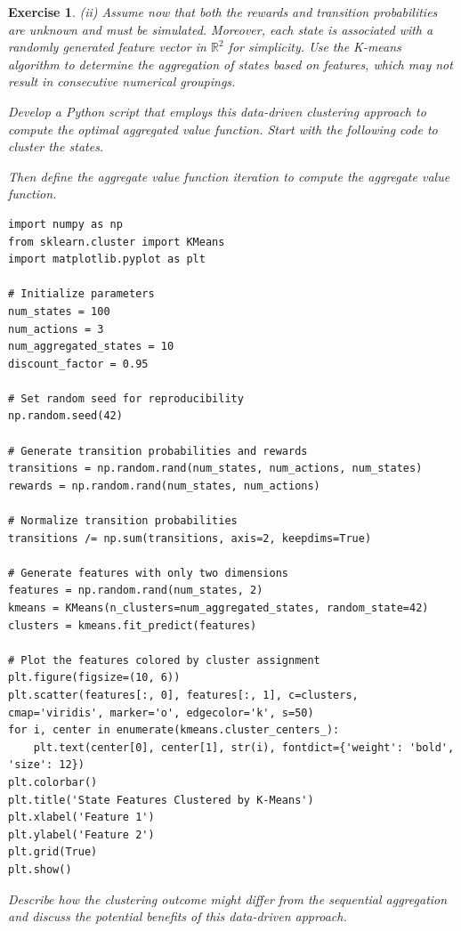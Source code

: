\documentclass[letter,11pt]{article}
\newtheorem{exercise}{Exercise}[section]
\begin{document}
\begin{exercise}
   (ii) Assume now that both the rewards and transition probabilities are unknown and must be simulated. Moreover, each state is associated with a randomly generated feature vector in $\mathbb{R}^{2}$ for simplicity. Use the K-means algorithm to determine the aggregation of states based on features, which may not result in consecutive numerical groupings.

    Develop a Python script that employs this data-driven clustering approach to compute the optimal aggregated value function. Start with the following code to cluster the states.  

    Then define the aggregate value function iteration to compute the aggregate value function. 
   \begin{lstlisting}
import numpy as np
from sklearn.cluster import KMeans
import matplotlib.pyplot as plt

# Initialize parameters
num_states = 100
num_actions = 3
num_aggregated_states = 10
discount_factor = 0.95

# Set random seed for reproducibility
np.random.seed(42)

# Generate transition probabilities and rewards
transitions = np.random.rand(num_states, num_actions, num_states)
rewards = np.random.rand(num_states, num_actions)

# Normalize transition probabilities
transitions /= np.sum(transitions, axis=2, keepdims=True)

# Generate features with only two dimensions
features = np.random.rand(num_states, 2)
kmeans = KMeans(n_clusters=num_aggregated_states, random_state=42)
clusters = kmeans.fit_predict(features)

# Plot the features colored by cluster assignment
plt.figure(figsize=(10, 6))
plt.scatter(features[:, 0], features[:, 1], c=clusters, cmap='viridis', marker='o', edgecolor='k', s=50)
for i, center in enumerate(kmeans.cluster_centers_):
    plt.text(center[0], center[1], str(i), fontdict={'weight': 'bold', 'size': 12})
plt.colorbar()
plt.title('State Features Clustered by K-Means')
plt.xlabel('Feature 1')
plt.ylabel('Feature 2')
plt.grid(True)
plt.show()
    \end{lstlisting}
    
    Describe how the clustering outcome might differ from the sequential aggregation and discuss the potential benefits of this data-driven approach.
\end{exercise}
\end{document}
